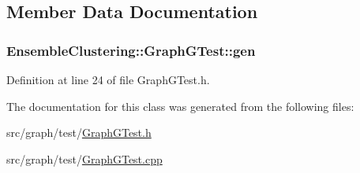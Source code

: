 \subsection{Member Data Documentation}
\hypertarget{class_ensemble_clustering_1_1_graph_g_test_a8233040cfa6b04e5a36d2bc0bfe1bc07}{
\subsubsection[{gen}]{ Ensemble\-Clustering\-::\-Graph\-G\-Test\-::gen\hspace{0.3cm}{\ttfamily [protected]}}}\label{class_ensemble_clustering_1_1_graph_g_test_a8233040cfa6b04e5a36d2bc0bfe1bc07}


Definition at line 24 of file Graph\-G\-Test.\-h.



The documentation for this class was generated from the following files\-:\begin{DoxyCompactItemize}
\item 
src/graph/test/\hyperlink{_graph_g_test_8h}{Graph\-G\-Test.\-h}\item 
src/graph/test/\hyperlink{_graph_g_test_8cpp}{Graph\-G\-Test.\-cpp}\end{DoxyCompactItemize}
